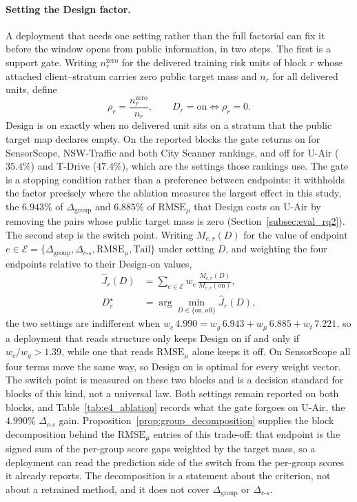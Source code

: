 \documentclass[letterpaper,journal]{IEEEtran}
\begin{document}
\paragraph{Setting the Design factor.}
A deployment that needs one setting rather than the full factorial can fix it
before the window opens from public information, in two steps.  The first is a
support gate.  Writing $n^{\mathrm{zero}}_r$ for the delivered training risk units
of block $r$ whose attached client--stratum carries zero public target mass and
$n_r$ for all delivered units, define
\begin{equation}
\rho_r=\frac{n^{\mathrm{zero}}_r}{n_r},
\qquad
D_r=\mathrm{on}\iff\rho_r=0 .
\label{eq:design_gate}
\end{equation}
Design is on exactly when no delivered unit sits on a stratum that the public
target map declares empty.  On the reported blocks the gate returns on for
SensorScope, NSW-Traffic and both City Scanner rankings, and off for U-Air
($35.4\%$) and T-Drive ($47.4\%$), which are the settings those rankings use.
The gate is a stopping condition rather than a preference between endpoints: it
withholds the factor precisely where the ablation measures the largest effect in
this study, the $6.943\%$ of $\Delta_{\mathrm{group}}$ and $6.885\%$ of
$\mathrm{RMSE}_{\mu}$ that Design costs on U-Air by removing the pairs whose
public target mass is zero (Section~\ref{subsec:eval_rq2}).  The second step is
the switch point.  Writing $M_{e,r}(D)$ for the value of endpoint
$e\in\mathcal{E}=\{\Delta_{\mathrm{group}},\Delta_{c\text{-}s},
\mathrm{RMSE}_{\mu},\mathrm{Tail}\}$ under setting $D$, and weighting the four
endpoints relative to their Design-on values,
\begin{equation}
\begin{aligned}
\widehat J_r(D)&=\sum_{e\in\mathcal{E}}w_e\,\frac{M_{e,r}(D)}{M_{e,r}(\mathrm{on})},\\
D_r^{\star}&=\arg\min_{D\in\{\mathrm{on},\mathrm{off}\}}\widehat J_r(D),
\end{aligned}
\label{eq:design_switch}
\end{equation}
the two settings are indifferent when
$w_c\,4.990=w_g\,6.943+w_\mu\,6.885+w_t\,7.221$, so a deployment that reads
structure only keeps Design on if and only if $w_c/w_g>1.39$, while one that
reads $\mathrm{RMSE}_{\mu}$ alone keeps it off.  On SensorScope all four terms
move the same way, so Design on is optimal for every weight vector.  The switch
point is measured on these two blocks and is a decision standard for blocks of
this kind, not a universal law.  Both settings remain reported on both blocks,
and Table~\ref{tab:e4_ablation} records what the gate forgoes on U-Air, the
$4.990\%$ $\Delta_{c\text{-}s}$ gain.  Proposition~\ref{prop:group_decomposition}
supplies the block decomposition behind the $\mathrm{RMSE}_{\mu}$ entries of this
trade-off: that endpoint is the signed sum of the per-group score gaps weighted
by the target mass, so a deployment can read the prediction side of the switch
from the per-group scores it already reports.  The decomposition is a statement
about the criterion, not about a retrained method, and it does not cover
$\Delta_{\mathrm{group}}$ or $\Delta_{c\text{-}s}$.
\end{document}
